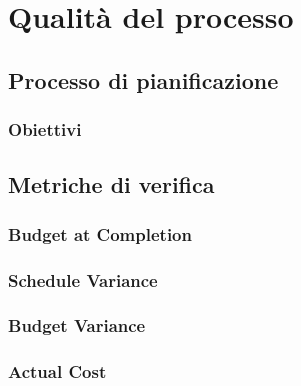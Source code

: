 \section{Qualità del processo}

\subsection{Processo di pianificazione}

\subsubsection{Obiettivi}

\subsection{Metriche di verifica}

\subsubsection{Budget at Completion}

\subsubsection{Schedule Variance}

\subsubsection{Budget Variance}

\subsubsection{Actual Cost}